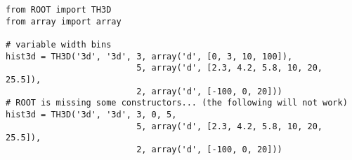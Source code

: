 \begin{footnotesize}
\begin{verbatim}
from ROOT import TH3D
from array import array

# variable width bins
hist3d = TH3D('3d', '3d', 3, array('d', [0, 3, 10, 100]),
                          5, array('d', [2.3, 4.2, 5.8, 10, 20, 25.5]),
                          2, array('d', [-100, 0, 20]))
# ROOT is missing some constructors... (the following will not work)
hist3d = TH3D('3d', '3d', 3, 0, 5,
                          5, array('d', [2.3, 4.2, 5.8, 10, 20, 25.5]),
                          2, array('d', [-100, 0, 20]))
\end{verbatim}
\end{footnotesize}
